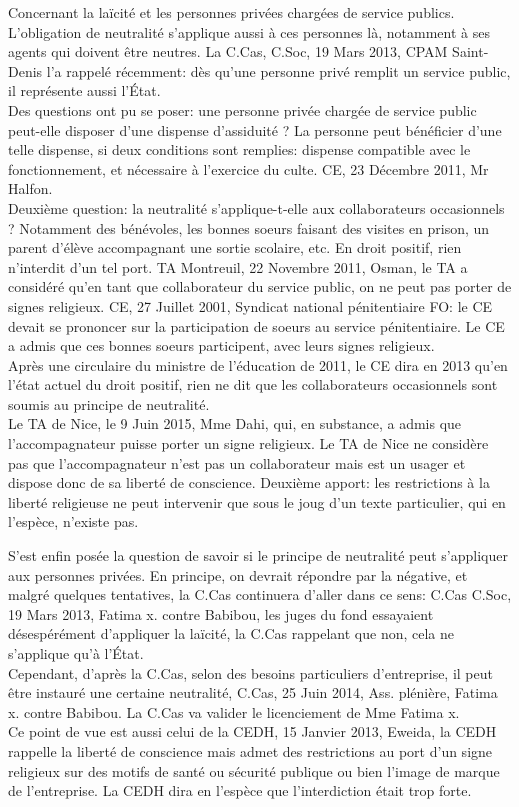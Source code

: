 \documentclass[10pt, a4paper, openany]{book}
\begin{document}
Concernant la laïcité et les personnes privées chargées de service publics. L'obligation de neutralité s'applique aussi à ces personnes là, notamment à ses agents qui doivent être neutres. La C.Cas, C.Soc, 19 Mars 2013, CPAM Saint-Denis l'a rappelé récemment: dès qu'une personne privé remplit un service public, il représente aussi l'État. \\
Des questions ont pu se poser: une personne privée chargée de service public peut-elle disposer d'une dispense d'assiduité ? La personne peut bénéficier d'une telle dispense, si deux conditions sont remplies: dispense compatible avec le fonctionnement, et nécessaire à l'exercice du culte. CE, 23 Décembre 2011, Mr Halfon. \\
Deuxième question: la neutralité s'applique-t-elle aux collaborateurs occasionnels ? Notamment des bénévoles, les bonnes soeurs faisant des visites en prison, un parent d'élève accompagnant une sortie scolaire, etc. En droit positif, rien n'interdit d'un tel port. TA Montreuil, 22 Novembre 2011, Osman, le TA a considéré qu'en tant que collaborateur du service public, on ne peut pas porter de signes religieux. CE, 27 Juillet 2001, Syndicat national pénitentiaire FO: le CE devait se prononcer sur la participation de soeurs au service pénitentiaire. Le CE a admis que ces bonnes soeurs participent, avec leurs signes religieux. \\
Après une circulaire du ministre de l'éducation de 2011, le CE dira en 2013 qu'en l'état actuel du droit positif, rien ne dit que les collaborateurs occasionnels sont soumis au principe de neutralité. \\
Le TA de Nice, le 9 Juin 2015, Mme Dahi, qui, en substance, a admis que l'accompagnateur puisse porter un signe religieux. Le TA de Nice ne considère pas que l'accompagnateur n'est pas un collaborateur mais est un usager et dispose donc de sa liberté de conscience. Deuxième apport: les restrictions à la liberté religieuse ne peut intervenir que sous le joug d'un texte particulier, qui en l'espèce, n'existe pas.


S'est enfin posée la question de savoir si le principe de neutralité peut s'appliquer aux personnes privées. En principe, on devrait répondre par la négative, et malgré quelques tentatives, la C.Cas continuera d'aller dans ce sens: C.Cas C.Soc, 19 Mars 2013, Fatima x. contre Babibou, les juges du fond essayaient désespérément d'appliquer la laïcité, la C.Cas rappelant que non, cela ne s'applique qu'à l'État. \\
Cependant, d'après la C.Cas, selon des besoins particuliers d'entreprise, il peut être instauré une certaine neutralité, C.Cas, 25 Juin 2014, Ass. plénière, Fatima x. contre Babibou. La C.Cas va valider le licenciement de Mme Fatima x. \\
Ce point de vue est aussi celui de la CEDH, 15 Janvier 2013, Eweida, la CEDH rappelle la liberté de conscience mais admet des restrictions au port d'un signe religieux sur des motifs de santé ou sécurité publique ou bien l'image de marque de l'entreprise. La CEDH dira en l'espèce que l'interdiction était trop forte. 
\end{document}
